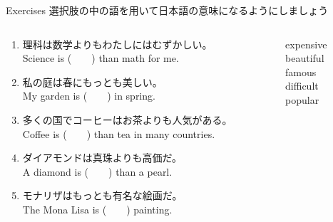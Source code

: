 \documentclass[aspectratio=169,xcolor={dvipsnames,table}]{beamer}
\begin{document}
\begin{frame}[plain]{Exercises}
選択肢の中の語を用いて日本語の意味になるようにしましょう
\begin{columns}[t]
 \begin{column}{.75\textwidth}
   \begin{enumerate}
  \item 理科は数学よりもわたしにはむずかしい。\\
	Science is (~~~~) than math for me.
  \item 私の庭は春にもっとも美しい。\\
	My garden is (~~~~) in spring.
  \item 多くの国でコーヒーはお茶よりも人気がある。\\
	Coffee is (~~~~) than tea in many countries.
  \item ダイアモンドは真珠よりも高価だ。\\
	A diamond is (~~~~) than a pearl.
  \item モナリザはもっとも有名な絵画だ。\\
	The Mona Lisa is (~~~~) painting.
 \end{enumerate}
 \end{column}
\begin{column}{.2\textwidth}
\begin{tcolorbox}
 expensive\\
beautiful\\
famous\\
difficult\\
popular
\end{tcolorbox}
\end{column}
\end{columns}
\end{frame}
\end{document}
